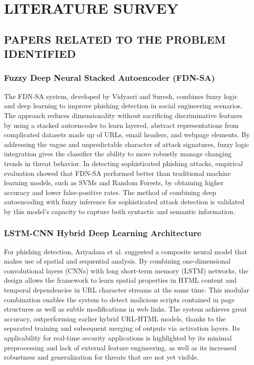 
\chapter{LITERATURE SURVEY} %
%
\section{PAPERS RELATED TO THE PROBLEM IDENTIFIED}
\subsection{Fuzzy Deep Neural Stacked Autoencoder (FDN-SA) 
}
The FDN-SA system, developed by Vidyasri and Suresh, combines fuzzy logic and deep learning to improve phishing detection in social engineering scenarios. The approach reduces dimensionality without sacrificing discriminative features by using a stacked autoencoder to learn layered, abstract representations from complicated datasets made up of URLs, email headers, and webpage elements. By addressing the vague and unpredictable character of attack signatures, fuzzy logic integration gives the classifier the ability to more robustly manage changing trends in threat behavior. In detecting sophisticated phishing attacks, empirical evaluation showed that FDN-SA performed better than traditional machine learning models, such as SVMs and Random Forests, by obtaining higher accuracy and lower false-positive rates. The method of combining deep autoencoding with fuzzy inference for sophisticated attack detection is validated by this model's capacity to capture both syntactic and semantic information.
%
\subsection{ LSTM-CNN Hybrid Deep Learning Architecture}
For phishing detection, Ariyadasa et al. suggested a composite neural model that makes use of spatial and sequential analysis. By combining one-dimensional convolutional layers (CNNs) with long short-term memory (LSTM) networks, the design allows the framework to learn spatial properties in HTML content and temporal dependencies in URL character streams at the same time. This modular combination enables the system to detect malicious scripts contained in page structures as well as subtle modifications in web links. The system achieves great accuracy, outperforming earlier hybrid URL-HTML models, thanks to the separated training and subsequent merging of outputs via activation layers. Its applicability for real-time security applications is highlighted by its minimal preprocessing and lack of external feature engineering, as well as its increased robustness and generalization for threats that are not yet visible.
%
